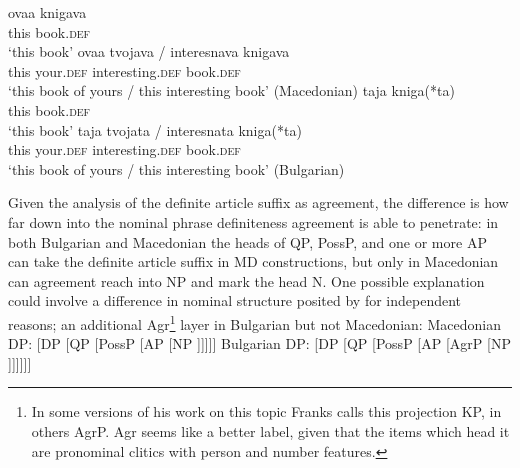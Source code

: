 \documentclass[output=paper,
colorlinks,
citecolor=brown,
newtxmath
]{langscibook}
\begin{document}
\ea \label{bookm}
\ea \label{book1}
\gll ovaa knigava\\
this book.\textsc{def} \\
\glt `this book'
\ex \label{booke2}
\gll ovaa tvojava / interesnava knigava\\
 this your.\textsc{def} { } interesting.\textsc{def} book.\textsc{def}\\
 \glt `this book of yours / this interesting book'  \hfill (Macedonian)
\z \z
\ea \label{bookb}
\ea
\gll taja kniga(*ta)\\
this book.\textsc{def} \\
\glt `this book'
\ex
\gll taja tvojata / interesnata kniga(*ta)\\
 this your.\textsc{def} { } interesting.\textsc{def} book.\textsc{def}\\
 \glt `this book of yours / this interesting book'  \hfill (Bulgarian)
\z \z

\noindent Given the analysis of the definite article suffix as agreement, the difference is how far down into the nominal phrase definiteness agreement is able to penetrate: in both Bulgarian and Macedonian the heads of QP, PossP, and one or more AP can take the definite article suffix in MD constructions, but only in Macedonian can agreement reach into NP and mark the head N. One possible explanation could involve a difference in nominal structure posited by \citet{Franks2015} for independent reasons; an additional Agr\footnote{In some versions of his work on this topic Franks calls this projection KP, in others AgrP. Agr seems like a better label, given that the items which head it are pronominal clitics with person and number features.} layer in Bulgarian but not Macedonian:
\ea
\ea Macedonian DP: \hspace{1em}	[DP [QP [PossP  [AP  [NP ]]]]]
\ex Bulgarian DP:  \hspace{2em}	[DP [QP [PossP  [AP  [AgrP [NP ]]]]]]
\z \z
\end{document}
